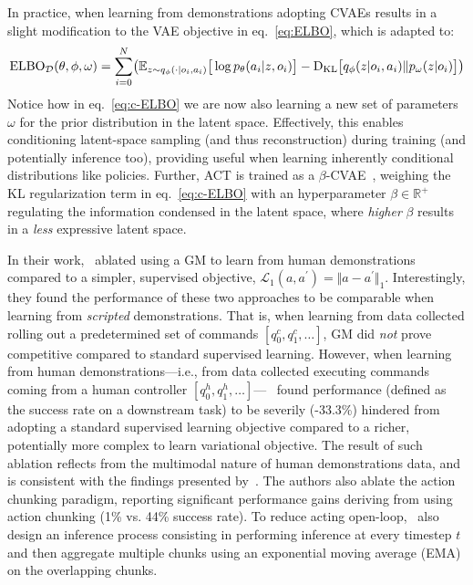 In practice, when learning from demonstrations adopting CVAEs results in a slight modification to the VAE objective in eq.~\ref{eq:ELBO}, which is adapted to:
\begin{align}\label{eq:c-ELBO}
    \text{ELBO}_{\mathcal D}(\theta, \phi, \omega) = \sum_{i=0}^{N} \left(
            \mathbb{E}_{z \sim q_\phi(\cdot \vert o_i, a_i)} \big[ \log p_\theta(a_i \vert z, o_i) \big]
        - \DKL \big[ q_\phi(z \vert o_i, a_i) \Vert p_\omega(z \vert o_i) \big]
        \right)
\end{align}
Notice how in eq.~\ref{eq:c-ELBO} we are now also learning a new set of parameters \( \omega \) for the prior distribution in the latent space.
Effectively, this enables conditioning latent-space sampling (and thus reconstruction) during training (and potentially inference too), providing useful when learning inherently conditional distributions like policies.
Further, ACT is trained as a \( \beta\)-CVAE~\citep{higgins2017beta}, weighing the KL regularization term in eq.~\ref{eq:c-ELBO} with an hyperparameter \( \beta \in \mathbb R^+ \) regulating the information condensed in the latent space, where \emph{higher} \( \beta \) results in a \emph{less} expressive latent space.

In their work,~\citet{zhaoLearningFineGrainedBimanual2023} ablated using a GM to learn from human demonstrations compared to a simpler, supervised objective, \( \mathcal L_1(a,a^\prime) = \Vert a - a^\prime \Vert_1 \).
Interestingly, they found the performance of these two approaches to be comparable when learning from \emph{scripted} demonstrations. 
That is, when learning from data collected rolling out a predetermined set of commands \( [q^c_0, q^c_1, \dots] \), GM did \emph{not} prove competitive compared to standard supervised learning.
However, when learning from human demonstrations---i.e., from data collected executing commands coming from a human controller \( [q^h_0, q^h_1, \dots] \)---~\citet{zhaoLearningFineGrainedBimanual2023} found performance (defined as the success rate on a downstream task) to be severily (-33.3\%) hindered from adopting a standard supervised learning objective compared to a richer, potentially more complex to learn variational objective.
The result of such ablation reflects from the multimodal nature of human demonstrations data, and is consistent with the findings presented by~\citet{florenceImplicitBehavioralCloning2022}.
The authors also ablate the action chunking paradigm, reporting significant performance gains deriving from using action chunking (1\% vs. 44\% success rate).
To reduce acting open-loop,~\citet{zhaoLearningFineGrainedBimanual2023} also design an inference process consisting in performing inference at every timestep \( t \) and then aggregate multiple chunks using an exponential moving average (EMA) on the overlapping chunks.

